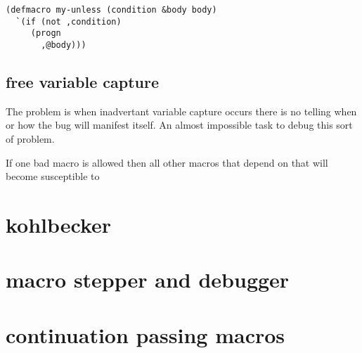 \documentclass{article}
\begin{document}
\begin{verbatim}
(defmacro my-unless (condition &body body)
  `(if (not ,condition)
     (progn
       ,@body)))
\end{verbatim}




\subsection{free variable capture}

The problem is when inadvertant variable capture occurs there is no telling
when or how the bug will manifest itself.  An almost impossible task to
debug this sort of problem.

If one bad macro is allowed then all other macros that depend on that will
become susceptible to 


\section{kohlbecker}

\section{macro stepper and debugger}


\section{continuation passing macros}
\end{document}
